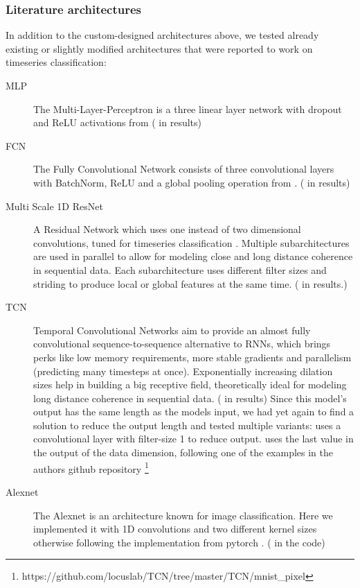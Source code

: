 \subsubsection{Literature architectures} \label{sec:literature-arch}
In addition to the custom-designed architectures above, we tested already existing or slightly modified architectures that were reported to work on timeseries classification:
\begin{description}
	\item [MLP] The Multi-Layer-Perceptron is a three linear layer network with dropout and ReLU activations from \autocite{strongbaseline} ( in results)
	\item [FCN] The Fully Convolutional Network consists of three convolutional layers with BatchNorm, ReLU and a global pooling operation from \autocite{strongbaseline}. ( in results)	
	\item [Multi Scale 1D ResNet] A Residual Network which uses one instead of two dimensional convolutions, tuned for timeseries classification \autocite{githubmultiscale}. Multiple subarchitectures are used in parallel to allow for modeling close and long distance coherence in sequential data. Each subarchitecture uses different filter sizes and striding to produce local or global features at the same time. ( in results.)
	\item [TCN] Temporal Convolutional Networks \autocite{bai2018empirical} aim to provide an almost fully convolutional sequence-to-sequence alternative to RNNs, which brings perks like low memory requirements, more stable gradients and parallelism (predicting many timesteps at once). Exponentially increasing dilation sizes help in building a big receptive field, theoretically ideal for modeling long distance coherence in sequential data. ( in results)
	Since this model's output has the same length as the models input, we had yet again to find a solution to reduce the output length and tested multiple variants:
	 uses a convolutional layer with filter-size 1 to reduce output.  uses the last value in the output of the data dimension, following one of the examples in the authors github repository \footnote{https://github.com/locuslab/TCN/tree/master/TCN/mnist\_pixel}
	\item[Alexnet] The Alexnet is an architecture known for image classification. Here we implemented it with 1D convolutions and two different kernel sizes otherwise following the implementation from pytorch \autocite{visionalexnetpyatmasterpytorchvision-2021-06-26}.	( in the code)
\end{description}

